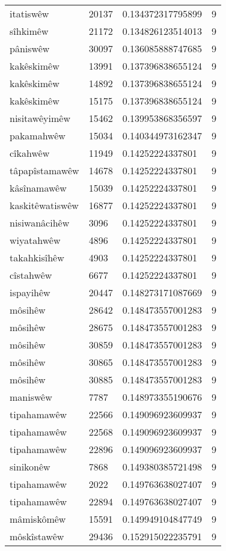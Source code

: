 \begin{longtable}{llll}
itatiswêw & 20137 & 0.134372317795899 & 9\\
sîhkimêw & 21172 & 0.134826123514013 & 9\\
pâniswêw & 30097 & 0.136085888747685 & 9\\
kakêskimêw & 13991 & 0.137396838655124 & 9\\
kakêskimêw & 14892 & 0.137396838655124 & 9\\
kakêskimêw & 15175 & 0.137396838655124 & 9\\
nisitawêyimêw & 15462 & 0.139953868356597 & 9\\
pakamahwêw & 15034 & 0.140344973162347 & 9\\
cîkahwêw & 11949 & 0.14252224337801 & 9\\
tâpapîstamawêw & 14678 & 0.14252224337801 & 9\\
kâsînamawêw & 15039 & 0.14252224337801 & 9\\
kaskitêwatiswêw & 16877 & 0.14252224337801 & 9\\
nisiwanâcihêw & 3096 & 0.14252224337801 & 9\\
wiyatahwêw & 4896 & 0.14252224337801 & 9\\
takahkisîhêw & 4903 & 0.14252224337801 & 9\\
cîstahwêw & 6677 & 0.14252224337801 & 9\\
ispayihêw & 20447 & 0.148273171087669 & 9\\
môsihêw & 28642 & 0.148473557001283 & 9\\
môsihêw & 28675 & 0.148473557001283 & 9\\
môsihêw & 30859 & 0.148473557001283 & 9\\
môsihêw & 30865 & 0.148473557001283 & 9\\
môsihêw & 30885 & 0.148473557001283 & 9\\
maniswêw & 7787 & 0.148973355190676 & 9\\
tipahamawêw & 22566 & 0.149096923609937 & 9\\
tipahamawêw & 22568 & 0.149096923609937 & 9\\
tipahamawêw & 22896 & 0.149096923609937 & 9\\
sinikonêw & 7868 & 0.149380385721498 & 9\\
tipahamawêw & 2022 & 0.149763638027407 & 9\\
tipahamawêw & 22894 & 0.149763638027407 & 9\\
mâmiskômêw & 15591 & 0.149949104847749 & 9\\
môskîstawêw & 29436 & 0.152915022235791 & 9\\

\end{longtable}
